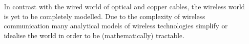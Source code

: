 In contrast with the wired world of optical and copper cables, the wireless world is yet to be completely modelled. Due to the complexity of wireless communication many analytical models of wireless technologies simplify or idealise the world in order to be (mathematically) tractable. 
